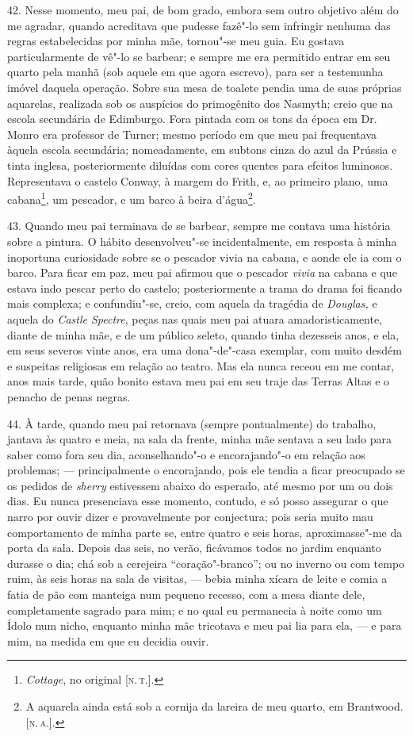 42. Nesse momento, meu pai, de bom grado, embora sem outro objetivo além
do me agradar, quando acreditava que pudesse fazê"-lo sem infringir
nenhuma das regras estabelecidas por minha mãe, tornou"-se meu guia. Eu
gostava particularmente de vê"-lo se barbear; e sempre me era permitido
entrar em seu quarto pela manhã (sob aquele em que agora escrevo), para
ser a testemunha imóvel daquela operação. Sobre sua mesa de toalete
pendia uma de suas próprias aquarelas, realizada sob os auspícios do
primogênito dos Nasmyth; creio que na escola secundária de Edimburgo.
Fora pintada com os tons da época em Dr. Monro era professor de Turner;
mesmo período em que meu pai frequentava àquela escola secundária;
nomeadamente, em subtons cinza do azul da Prússia e tinta inglesa,
posteriormente diluídas com cores quentes para efeitos luminosos.
Representava o castelo Conway, à margem do Frith, e, ao primeiro plano,
uma cabana\footnote{\emph{Cottage}, no original {[}\textsc{n.\,t.}{]}.}, um
pescador, e um barco à beira d'água\footnote{A aquarela ainda está sob a
  cornija da lareira de meu quarto, em Brantwood. {[}\textsc{n.\,a.}{]}.}.

43. Quando meu pai terminava de se barbear, sempre me contava uma
história sobre a pintura. O hábito desenvolveu"-se incidentalmente, em
resposta à minha inoportuna curiosidade sobre se o pescador vivia na
cabana, e aonde ele ia com o barco. Para ficar em paz, meu pai afirmou
que o pescador \emph{vivia} na cabana e que estava indo pescar perto do
castelo; posteriormente a trama do drama foi ficando mais complexa; e
confundiu"-se, creio, com aquela da tragédia de \emph{Douglas,} e aquela
do \emph{Castle Spectre}, peças nas quais meu pai atuara
amadoristicamente, diante de minha mãe, e de um público seleto, quando
tinha dezesseis anos, e ela, em seus severos vinte anos, era uma
dona"-de"-casa exemplar, com muito desdém e suspeitas religiosas em
relação ao teatro. Mas ela nunca receou em me contar, anos mais tarde,
quão bonito estava meu pai em seu traje das Terras Altas e o penacho de
penas negras.

44. À tarde, quando meu pai retornava (sempre pontualmente) do trabalho,
jantava às quatro e meia, na sala da frente, minha mãe sentava a seu
lado para saber como fora seu dia, aconselhando"-o e encorajando"-o em
relação aos problemas; --- principalmente o encorajando, pois ele tendia
a ficar preocupado se os pedidos de \emph{sherry} estivessem abaixo do
esperado, até mesmo por um ou dois dias. Eu nunca presenciava esse
momento, contudo, e só posso assegurar o que narro por ouvir dizer e
provavelmente por conjectura; pois seria muito mau comportamento de
minha parte se, entre quatro e seis horas, aproximasse"-me da porta da
sala. Depois das seis, no verão, ficávamos todos no jardim enquanto
durasse o dia; chá sob a cerejeira ``coração"-branco''; ou no inverno ou
com tempo ruim, às seis horas na sala de visitas, --- bebia minha xícara
de leite e comia a fatia de pão com manteiga num pequeno recesso, com a
mesa diante dele, completamente sagrado para mim; e no qual eu
permanecia à noite como um Ídolo num nicho, enquanto minha mãe tricotava
e meu pai lia para ela, --- e para mim, na medida em que eu decidia
ouvir.

